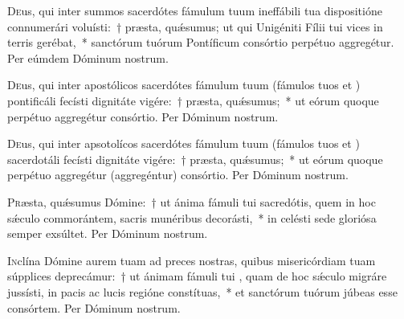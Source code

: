 \documentclass[vesperale_romanum]{subfiles}
\begin{document}

\lettrine{D}{e}us, qui inter summos sacerdótes fámulum tuum \nomen{} ineffábili tua dispositióne connumerári voluísti:~†
 præsta, quǽsumus; ut qui Unigéniti Fílii tui vices in terris gerébat,~*
  san\-ctórum tuórum Pontíficum consórtio perpétuo aggregétur. Per eúmdem Dóminum nostrum.


\lettrine{D}{e}us,  qui inter apostólicos sacerdótes fámulum tuum \nomen{} (fámulos tuos \nomen{} et  \nomen{}) 
pontificáli fecísti dignitáte vigére:~† præsta, quǽsumus;~* ut eórum quoque perpétuo aggregétur consórtio. Per Dóminum nostrum.






\lettrine{D}{e}us, qui inter apsotolícos sacerdótes fámulum tuum \nomen{} (fámulos tuos \nomen{} et \nomen{})
 sacerdotáli fecísti dignitáte vigére:~† præsta, quǽsumus;~*
  ut eórum quoque perpétuo aggregétur (aggregéntur) consórtio. Per Dóminum nostrum.


\lettrine{P}{r}æsta, quǽsumus Dómine:~† ut ánima fámuli tui \nomen{} sacredótis, quem in hoc sǽculo commorántem,
 sacris munéribus decorásti,~* in celésti sede gloriósa semper exsúltet. 
Per Dóminum nostrum.


\lettrine{I}{n}clína Dómine aurem tuam ad preces nostras, quibus misericórdiam tuam súpplices deprecámur:~† ut ánimam fámuli tui \nomen{}, quam de hoc sǽculo migráre jussísti, in pacis ac lucis regióne constítuas,~* et san\-ctórum tuórum júbeas esse consórtem. Per Dóminum nostrum.
\end{document}
